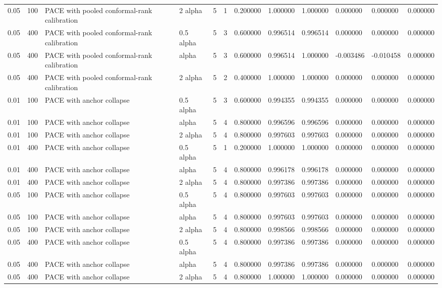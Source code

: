 \begin{tabular}{llllllllllll}
0.05 & 100 & PACE with pooled conformal-rank calibration & 2 alpha & 5 & 1 & 0.200000 & 1.000000 & 1.000000 & 0.000000 & 0.000000 & 0.000000 \\
0.05 & 400 & PACE with pooled conformal-rank calibration & 0.5 alpha & 5 & 3 & 0.600000 & 0.996514 & 0.996514 & 0.000000 & 0.000000 & 0.000000 \\
0.05 & 400 & PACE with pooled conformal-rank calibration & alpha & 5 & 3 & 0.600000 & 0.996514 & 1.000000 & -0.003486 & -0.010458 & 0.000000 \\
0.05 & 400 & PACE with pooled conformal-rank calibration & 2 alpha & 5 & 2 & 0.400000 & 1.000000 & 1.000000 & 0.000000 & 0.000000 & 0.000000 \\
0.01 & 100 & PACE with anchor collapse & 0.5 alpha & 5 & 3 & 0.600000 & 0.994355 & 0.994355 & 0.000000 & 0.000000 & 0.000000 \\
0.01 & 100 & PACE with anchor collapse & alpha & 5 & 4 & 0.800000 & 0.996596 & 0.996596 & 0.000000 & 0.000000 & 0.000000 \\
0.01 & 100 & PACE with anchor collapse & 2 alpha & 5 & 4 & 0.800000 & 0.997603 & 0.997603 & 0.000000 & 0.000000 & 0.000000 \\
0.01 & 400 & PACE with anchor collapse & 0.5 alpha & 5 & 1 & 0.200000 & 1.000000 & 1.000000 & 0.000000 & 0.000000 & 0.000000 \\
0.01 & 400 & PACE with anchor collapse & alpha & 5 & 4 & 0.800000 & 0.996178 & 0.996178 & 0.000000 & 0.000000 & 0.000000 \\
0.01 & 400 & PACE with anchor collapse & 2 alpha & 5 & 4 & 0.800000 & 0.997386 & 0.997386 & 0.000000 & 0.000000 & 0.000000 \\
0.05 & 100 & PACE with anchor collapse & 0.5 alpha & 5 & 4 & 0.800000 & 0.997603 & 0.997603 & 0.000000 & 0.000000 & 0.000000 \\
0.05 & 100 & PACE with anchor collapse & alpha & 5 & 4 & 0.800000 & 0.997603 & 0.997603 & 0.000000 & 0.000000 & 0.000000 \\
0.05 & 100 & PACE with anchor collapse & 2 alpha & 5 & 4 & 0.800000 & 0.998566 & 0.998566 & 0.000000 & 0.000000 & 0.000000 \\
0.05 & 400 & PACE with anchor collapse & 0.5 alpha & 5 & 4 & 0.800000 & 0.997386 & 0.997386 & 0.000000 & 0.000000 & 0.000000 \\
0.05 & 400 & PACE with anchor collapse & alpha & 5 & 4 & 0.800000 & 0.997386 & 0.997386 & 0.000000 & 0.000000 & 0.000000 \\
0.05 & 400 & PACE with anchor collapse & 2 alpha & 5 & 4 & 0.800000 & 1.000000 & 1.000000 & 0.000000 & 0.000000 & 0.000000 \\

\end{tabular}
